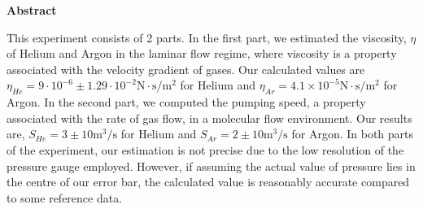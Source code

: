 
\noindent
\textbf{Abstract}
\vspace{12pt}

This experiment consists of 2 parts. In the first part, we estimated the viscosity, $\eta$ of Helium and Argon in the laminar flow regime, where viscosity is a property associated with the velocity gradient of gases. Our calculated values are $\eta_{He}= 9 \cdot 10^{-6} \pm 1.29 \cdot 10^{-2} \si{\newton\cdot\second\per\metre^2}$ for Helium and $\eta_{Ar}= 4.1 \times 10^{-5}  \si{\newton\cdot\second\per\metre^2}$ for Argon.  In the second part, we computed the pumping speed, a property associated with the rate of gas flow, in a molecular flow environment. Our results are, $S_{He}= 3 \pm 10 \si{\meter^3\per\second}$ for Helium and $S_{Ar}= 2 \pm 10 \si{\meter^3\per\second}$ for Argon.
In both parts of the experiment, our estimation is not precise due to the low resolution of the pressure gauge employed. However, if assuming the actual value of pressure lies in the centre of our error bar, the calculated value is reasonably accurate compared to some reference data.

